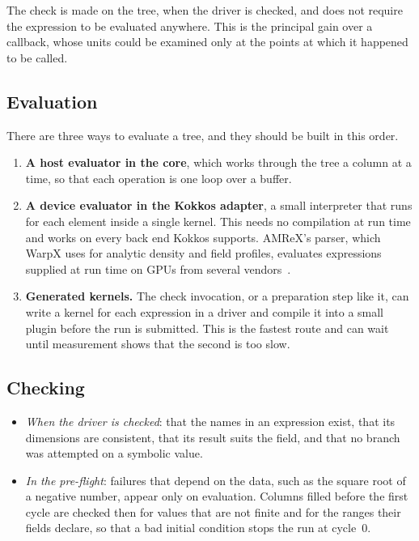 \documentclass[11pt,a4paper]{article}
\begin{document}
The check is made on the tree, when the driver is checked, and does not
require the expression to be evaluated anywhere.  This is the principal
gain over a callback, whose units could be examined only at the points at
which it happened to be called.

\subsection{Evaluation}

There are three ways to evaluate a tree, and they should be built in this
order.

\begin{enumerate}
  \item \textbf{A host evaluator in the core}, which works through the tree
        a column at a time, so that each operation is one loop over a
        buffer.
  \item \textbf{A device evaluator in the Kokkos adapter}, a small
        interpreter that runs for each element inside a single kernel.
        This needs no compilation at run time and works on every back end
        Kokkos supports.  AMReX's parser, which WarpX uses for analytic
        density and field profiles, evaluates expressions supplied at run
        time on GPUs from several vendors~\cite{amrexparser,warpxparams}.
  \item \textbf{Generated kernels.}  The check invocation, or a preparation
        step like it, can write a kernel for each expression in a driver
        and compile it into a small plugin before the run is submitted.
        This is the fastest route and can wait until measurement shows that
        the second is too slow.
\end{enumerate}

\subsection{Checking}

\begin{itemize}
  \item \emph{When the driver is checked}: that the names in an expression
        exist, that its dimensions are consistent, that its result suits
        the field, and that no branch was attempted on a symbolic value.
  \item \emph{In the pre-flight}: failures that depend on the data, such as
        the square root of a negative number, appear only on evaluation.
        Columns filled before the first cycle are checked then for values
        that are not finite and for the ranges their fields declare, so
        that a bad initial condition stops the run at cycle~0.
\end{itemize}
\end{document}
